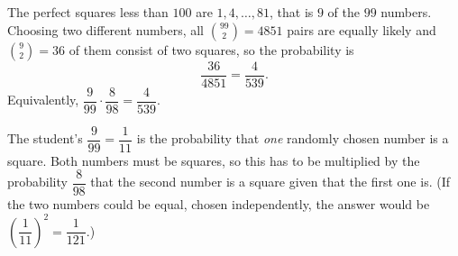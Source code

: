The perfect squares less than $100$ are $1,4,\dots,81$, that is $9$ of the $99$ numbers. Choosing two different numbers, all $\binom{99}{2}=4851$ pairs are equally likely and $\binom{9}{2}=36$ of them consist of two squares, so the probability is
\[
\dfrac{36}{4851}=\boxed{\dfrac{4}{539}} .
\]
Equivalently, $\dfrac{9}{99}\cdot\dfrac{8}{98}=\dfrac{4}{539}$.

The student's $\dfrac{9}{99}=\dfrac{1}{11}$ is the probability that \emph{one} randomly chosen number is a square. Both numbers must be squares, so this has to be multiplied by the probability $\dfrac{8}{98}$ that the second number is a square given that the first one is. (If the two numbers could be equal, chosen independently, the answer would be $\left(\dfrac{1}{11}\right)^2=\dfrac{1}{121}$.)
